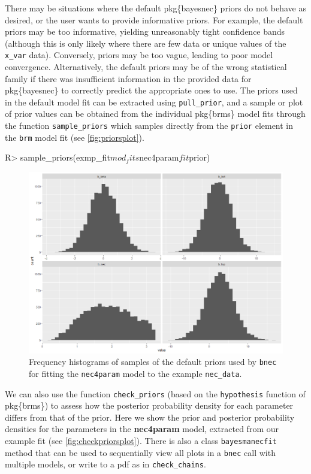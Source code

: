 \documentclass[
]{jss}
\begin{document}
There may be situations where the default pkg\{bayesnec\} priors do not
behave as desired, or the user wants to provide informative priors. For
example, the default priors may be too informative, yielding
unreasonably tight confidence bands (although this is only likely where
there are few data or unique values of the \texttt{x\_var} data).
Conversely, priors may be too vague, leading to poor model convergence.
Alternatively, the default priors may be of the wrong statistical family
if there was insufficient information in the provided data for
pkg\{bayesnec\} to correctly predict the appropriate ones to use. The
priors used in the default model fit can be extracted using
\texttt{pull\_prior}, and a sample or plot of prior values can be
obtained from the individual pkg\{brms\} model fits through the function
\texttt{sample\_priors} which samples directly from the \texttt{prior}
element in the \texttt{brm} model fit (see \autoref{fig:priorsplot}).

\begin{CodeChunk}
\begin{CodeInput}
R> sample_priors(exmp_fit$mod_fits$nec4param$fit$prior)
\end{CodeInput}
\end{CodeChunk}

\begin{figure}
\centering
\includegraphics{sample_prior.png}
\caption{Frequency histograms of samples of the default priors used by
\texttt{bnec} for fitting the \texttt{nec4param} model to the example
\texttt{nec\_data}.\label{fig:priorsplot}}
\end{figure}

We can also use the function \texttt{check\_priors} (based on the
\texttt{hypothesis} function of pkg\{brms\}) to assess how the posterior
probability density for each parameter differs from that of the prior.
Here we show the prior and posterior probability densities for the
parameters in the \textbf{nec4param} model, extracted from our example
fit (see \autoref{fig:checkpriorsplot}). There is also a class
\texttt{bayesmanecfit} method that can be used to sequentially view all
plots in a \texttt{bnec} call with multiple models, or write to a pdf as
in \texttt{check\_chains}.
\end{document}
